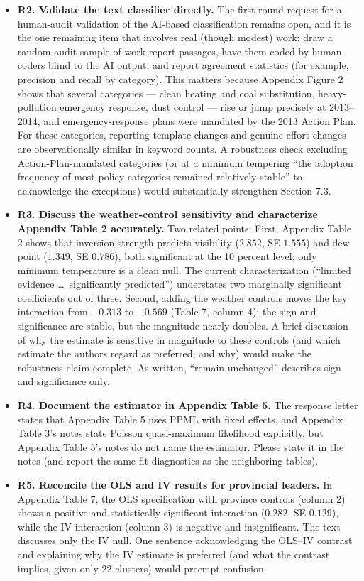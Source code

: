 \documentclass[12pt]{article}
\begin{document}
\begin{itemize}
    \item \textbf{R2. Validate the text classifier directly.}
    The first-round request for a human-audit validation of the AI-based classification remains open, and it is the one remaining item that involves real (though modest) work: draw a random audit sample of work-report passages, have them coded by human coders blind to the AI output, and report agreement statistics (for example, precision and recall by category). This matters because Appendix Figure 2 shows that several categories --- clean heating and coal substitution, heavy-pollution emergency response, dust control --- rise or jump precisely at 2013--2014, and emergency-response plans were mandated by the 2013 Action Plan. For these categories, reporting-template changes and genuine effort changes are observationally similar in keyword counts. A robustness check excluding Action-Plan-mandated categories (or at a minimum tempering ``the adoption frequency of most policy categories remained relatively stable'' to acknowledge the exceptions) would substantially strengthen Section 7.3.

    \item \textbf{R3. Discuss the weather-control sensitivity and characterize Appendix Table 2 accurately.}
    Two related points. First, Appendix Table 2 shows that inversion strength predicts visibility ($2.852$, SE $1.555$) and dew point ($1.349$, SE $0.786$), both significant at the 10 percent level; only minimum temperature is a clean null. The current characterization (``limited evidence \ldots\ significantly predicted'') understates two marginally significant coefficients out of three. Second, adding the weather controls moves the key interaction from $-0.313$ to $-0.569$ (Table 7, column 4): the sign and significance are stable, but the magnitude nearly doubles. A brief discussion of why the estimate is sensitive in magnitude to these controls (and which estimate the authors regard as preferred, and why) would make the robustness claim complete. As written, ``remain unchanged'' describes sign and significance only.

    \item \textbf{R4. Document the estimator in Appendix Table 5.}
    The response letter states that Appendix Table 5 uses PPML with fixed effects, and Appendix Table 3's notes state Poisson quasi-maximum likelihood explicitly, but Appendix Table 5's notes do not name the estimator. Please state it in the notes (and report the same fit diagnostics as the neighboring tables).

    \item \textbf{R5. Reconcile the OLS and IV results for provincial leaders.}
    In Appendix Table 7, the OLS specification with province controls (column 2) shows a positive and statistically significant interaction ($0.282$, SE $0.129$), while the IV interaction (column 3) is negative and insignificant. The text discusses only the IV null. One sentence acknowledging the OLS--IV contrast and explaining why the IV estimate is preferred (and what the contrast implies, given only 22 clusters) would preempt confusion.
\end{itemize}
\end{document}
